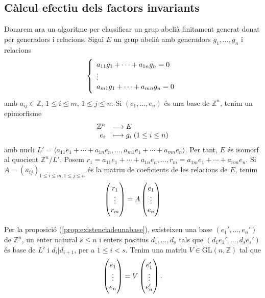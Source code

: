 \documentclass[../main.tex]{subfiles}
\begin{document}
\subsection{Càlcul efectiu dels factors invariants}
Donarem ara un algoritme per classificar un grup abelià finitament generat donat per generadors i relacions. Sigui $E$ un grup abelià amb generadors $g_1,\ldots,g_n$ i relacions
\begin{equation}
    \notag
    \left\{
    \begin{array}{ll}
        a_{11}g_1+\cdots +a_{1n}g_n = 0 \\
        \vdots\\
        a_{m1}g_1+\cdots+a_{mn}g_n = 0
    \end{array}
    \right.
\end{equation}
amb $a_{ij}\in \mathbb{Z}$, $1\leq i\leq m$, $1\leq j\leq n$. Si $(e_1,\ldots,e_n)$ és una base de $\mathbb{Z}^n$, tenim un epimorfisme
\begin{equation}
    \notag
    \begin{array}{rl}
        \mathbb{Z}^n & \longrightarrow E \\
        e_i & \longmapsto g_i\;(1\leq i\leq n)
    \end{array}
\end{equation}
amb nucli $L' = \langle a_{11}e_1+\cdots+a_{1n}e_n,\ldots,a_{m1}e_1+\cdots+a_{mn}e_n\rangle$. Per tant, $E$ és isomorf al quocient $\mathbb{Z}^n/L'$. Posem $r_1 = a_{11}e_1+\cdots+a_{1n}e_n,\ldots, r_m = a_{1m}e_1+\cdots+a_{nm}e_n$. Si $A = (a_{ij})_{1\leq i\leq m,1\leq j\leq n}$ és la matriu de coeficients de les relacions de $E$, tenim
\begin{equation}
    \notag
    \begin{pmatrix}
        r_1\\
        \vdots \\
        r_m
    \end{pmatrix}
    =
    A
    \begin{pmatrix}
    e_1\\\vdots\\e_n
    \end{pmatrix}
\end{equation}

Per la proposició (\ref{prop:existenciadeunabase}), existeixen una base $(e_1',\ldots,e_n')$ de $\mathbb{Z}^n$, un enter natural $s\leq n$ i enters positius $d_1,\ldots, d_s$ tals que $(d_1e_1',\ldots,d_se_s')$ és base de $L'$ i $d_i|d_{i+1}$, per a $1\leq i < s$. Tenim una matriu $V\in \text{GL}(n,\mathbb{Z})$ tal que
\begin{equation}
    \notag
    \begin{pmatrix}e_1\\\vdots\\e_n\end{pmatrix} = V\begin{pmatrix}e_1'\\\vdots\\e_n'\end{pmatrix} .
\end{equation}
\end{document}
